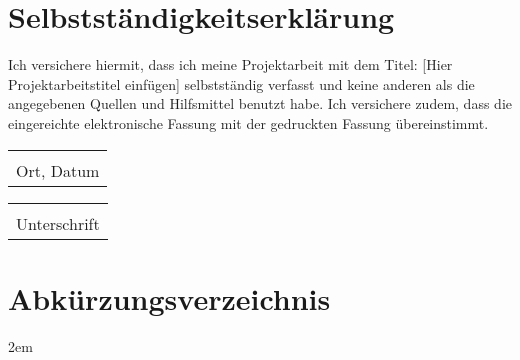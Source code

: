 \documentclass[a4paper, 12pt]{article}
\begin{document}
\section*{Selbstständigkeitserklärung}
Ich versichere hiermit, dass ich meine Projektarbeit mit dem Titel: [Hier Projektarbeitstitel einfügen] selbstständig verfasst und keine anderen als die angegebenen Quellen und Hilfsmittel benutzt habe. 
Ich versichere zudem, dass die eingereichte elektronische Fassung mit der gedruckten Fassung übereinstimmt.

\vspace{1.25cm}
\begin{flushleft}
    \begin{minipage}[c]{0.49\textwidth}
        \begin{tabular}{@{}p{2in}@{}}
            \hrulefill \\
            Ort, Datum \\
        \end{tabular}
    \end{minipage}
    \begin{minipage}[c]{0.49\textwidth}
        \begin{tabular}{@{}p{2in}@{}}
            \hrulefill \\
            Unterschrift \\
        \end{tabular}
    \end{minipage}
\end{flushleft}

\pagebreak
\section*{Abkürzungsverzeichnis}
\begin{acronym}
\end{acronym}
\pagebreak
\tableofcontents
\pagebreak
\listoffigures
\renewcommand\listoflistingscaption{Quellcodeverzeichnis}
\listoflistings
\pagebreak

\begin{refsection}
%

\pagebreak
\emergencystretch 2em
\printbibliography
\pagebreak
\end{refsection}

\end{document}

